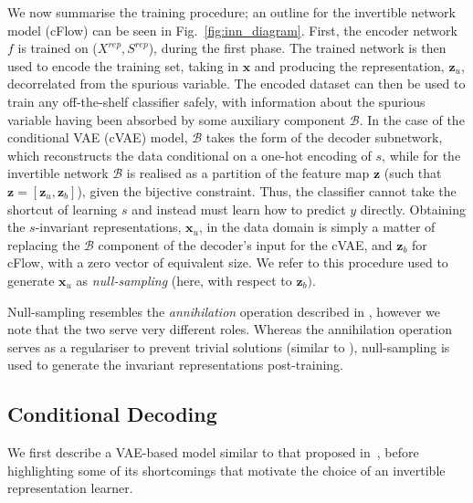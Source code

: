 We now summarise the training procedure; an outline for the invertible network model (cFlow) can be seen in Fig.~\ref{fig:inn_diagram}.
First, the encoder network $f$ is trained on ($X^\mathit{rep}, S^\mathit{rep}$), during the first phase.
The trained network is then used to encode the training set,
taking in $\bm{x}$ and producing the representation, $\bm{z}_u$, decorrelated from the spurious variable.
The encoded dataset can then be used to train any off-the-shelf classifier safely, with information about the spurious variable having been absorbed by some auxiliary component $\mathcal{B}$.
In the case of the conditional VAE (cVAE) model,
$\mathcal{B}$ takes the form of the decoder subnetwork, which reconstructs the data conditional on a one-hot encoding of $s$,
while for the invertible network $\mathcal{B}$ is realised as a partition of the feature map $\bm{z}$
(such that $\bm{z} = [\bm{z}_u, \bm{z}_b]$), given the bijective constraint.
Thus, the classifier cannot take the shortcut of learning $s$ and instead must learn how to predict $y$ directly.
Obtaining the $s$-invariant representations, $\bm{x}_u$, in the data domain
is simply a matter of replacing the $\mathcal{B}$ component of the decoder's input for the cVAE,
and $\bm{z}_b$ for cFlow, with a zero vector of equivalent size.
We refer to this procedure used to generate $\bm{x}_u$ as \emph{null-sampling} (here, with respect to $\bm{z}_b)$.

Null-sampling resembles the \emph{annihilation} operation described in \cite{xiao2017dna}, however we note that the two serve very different roles.  Whereas the annihilation operation serves as a regulariser to prevent trivial solutions (similar to \cite{jaiswal2018unsupervised}), null-sampling is used to generate the invariant representations post-training.

\subsection{Conditional Decoding}%
\label{conddec}
\noindent We first describe a VAE-based model similar to that proposed in~\cite{madras2018learning}, before highlighting some of its shortcomings that motivate the choice of an invertible representation learner.

